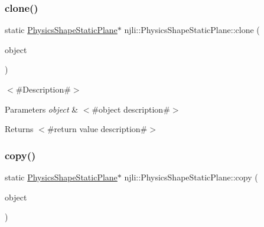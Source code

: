 \mbox{\label{classnjli_1_1_physics_shape_static_plane_ab3f56be3f14ac6fc2afbd8a8916c811b}} 
\subsubsection{\texorpdfstring{clone()}{clone()}}
{\footnotesize\ttfamily static \mbox{\hyperlink{classnjli_1_1_physics_shape_static_plane}{Physics\+Shape\+Static\+Plane}}$\ast$ njli\+::\+Physics\+Shape\+Static\+Plane\+::clone (\begin{DoxyParamCaption}\item[{const \mbox{\hyperlink{classnjli_1_1_physics_shape_static_plane}{Physics\+Shape\+Static\+Plane}} \&}]{object }\end{DoxyParamCaption})\hspace{0.3cm}{\ttfamily [static]}}

$<$\#\+Description\#$>$


\begin{DoxyParams}{Parameters}
{\em object} & $<$\#object description\#$>$\\
\hline
\end{DoxyParams}
\begin{DoxyReturn}{Returns}
$<$\#return value description\#$>$ 
\end{DoxyReturn}
\mbox{\label{classnjli_1_1_physics_shape_static_plane_a6cd5000f8c3d92e1e8f05c56d3bfe242}} 
\subsubsection{\texorpdfstring{copy()}{copy()}}
{\footnotesize\ttfamily static \mbox{\hyperlink{classnjli_1_1_physics_shape_static_plane}{Physics\+Shape\+Static\+Plane}}$\ast$ njli\+::\+Physics\+Shape\+Static\+Plane\+::copy (\begin{DoxyParamCaption}\item[{const \mbox{\hyperlink{classnjli_1_1_physics_shape_static_plane}{Physics\+Shape\+Static\+Plane}} \&}]{object }\end{DoxyParamCaption})\hspace{0.3cm}{\ttfamily [static]}}

